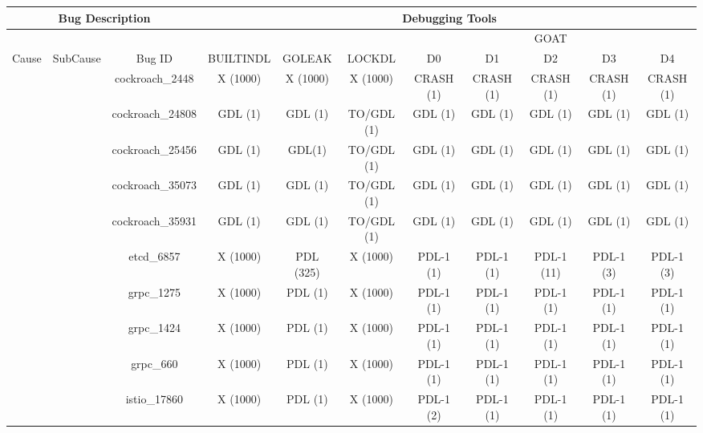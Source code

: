 \begin{tabular}{|c|c|c|ccc|ccccc|}
\hline
\multicolumn{3}{|c|}{Bug Description} & \multicolumn{8}{c|}{Debugging Tools} \\ \hline
 &  &  & \multicolumn{1}{c|}{} & \multicolumn{1}{c|}{} &  & \multicolumn{5}{c|}{GOAT} \\ \cline{7-11}
\multirow{-2}{*}{Cause} & \multirow{-2}{*}{SubCause} & \multirow{-2}{*}{Bug ID} & \multicolumn{1}{c|}{\multirow{-2}{*}{BUILTINDL}} & \multicolumn{1}{c|}{\multirow{-2}{*}{GOLEAK}} & \multirow{-2}{*}{LOCKDL} & \multicolumn{1}{c|}{D0} & \multicolumn{1}{c|}{D1} & \multicolumn{1}{c|}{D2} & \multicolumn{1}{c|}{D3} & D4 \\ \hline
 &  & cockroach\_2448 & X (1000) & X (1000) & X (1000) & CRASH (1) & CRASH (1) & CRASH (1) & CRASH (1) & CRASH (1) \\ \cline{3-3}
 &  & cockroach\_24808 & GDL (1) & GDL (1) & TO/GDL (1) & GDL (1) & GDL (1) & GDL (1) & GDL (1) & GDL (1) \\ \cline{3-3}
 &  & cockroach\_25456 & GDL (1) & GDL(1) & TO/GDL (1) & GDL (1) & GDL (1) & GDL (1) & GDL (1) & GDL (1) \\ \cline{3-3}
 &  & cockroach\_35073 & GDL (1) & GDL (1) & TO/GDL (1) & GDL (1) & GDL (1) & GDL (1) & GDL (1) & GDL (1) \\ \cline{3-3}
 &  & cockroach\_35931 & GDL (1) & GDL (1) & TO/GDL (1) & GDL (1) & GDL (1) & GDL (1) & GDL (1) & GDL (1) \\ \cline{3-3}
 &  & etcd\_6857 & X (1000) & PDL (325) & X (1000) & \cellcolor[HTML]{EFEFEF}PDL-1 (1) & \cellcolor[HTML]{EFEFEF}PDL-1 (1) & \cellcolor[HTML]{EFEFEF}PDL-1 (11) & \cellcolor[HTML]{EFEFEF}PDL-1 (3) & \cellcolor[HTML]{EFEFEF}PDL-1 (3) \\ \cline{3-3}
 &  & grpc\_1275 & X (1000) & PDL (1) & X (1000) & PDL-1 (1) & PDL-1 (1) & PDL-1 (1) & PDL-1 (1) & PDL-1 (1) \\ \cline{3-3}
 &  & grpc\_1424 & X (1000) & PDL (1) & X (1000) & PDL-1 (1) & PDL-1 (1) & PDL-1 (1) & PDL-1 (1) & PDL-1 (1) \\ \cline{3-3}
 &  & grpc\_660 & X (1000) & PDL (1) & X (1000) & PDL-1 (1) & PDL-1 (1) & PDL-1 (1) & PDL-1 (1) & PDL-1 (1) \\ \cline{3-3}
 &  & istio\_17860 & X (1000) & PDL (1) & X (1000) & PDL-1 (2) & PDL-1 (1) & PDL-1 (1) & PDL-1 (1) & PDL-1 (1) \\ \cline{3-3}

\end{tabular}
